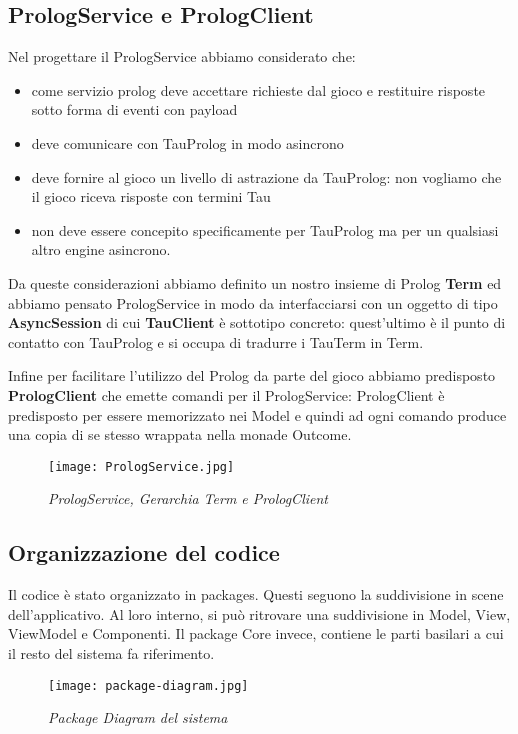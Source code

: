\subsection{PrologService e PrologClient}
Nel progettare il PrologService abbiamo considerato che:
\begin{itemize}
    \item come servizio prolog deve accettare richieste dal gioco e restituire risposte sotto forma di eventi con payload
    \item deve comunicare con TauProlog in modo asincrono
    \item deve fornire al gioco un livello di astrazione da TauProlog: non vogliamo che il gioco riceva risposte con termini Tau
    \item non deve essere concepito specificamente per TauProlog ma per un qualsiasi altro engine asincrono.
\end{itemize}   

Da queste considerazioni abbiamo definito un nostro insieme di Prolog \textbf{Term} ed abbiamo pensato PrologService in modo da interfacciarsi con un oggetto di tipo \textbf{AsyncSession} di cui \textbf{TauClient} è sottotipo concreto: quest'ultimo è il punto di contatto con TauProlog e si occupa di tradurre i TauTerm in Term.

Infine per facilitare l'utilizzo del Prolog da parte del gioco abbiamo predisposto \textbf{PrologClient} che emette comandi per il PrologService: PrologClient è predisposto per essere memorizzato nei Model e quindi ad ogni comando produce una copia di se stesso wrappata nella monade Outcome.

\begin{figure}[!hbt]
    \centering
    \texttt{[image: PrologService.jpg]}
    \caption{\textit{PrologService, Gerarchia Term e PrologClient}} 
\end{figure}

\subsection{Organizzazione del codice}
Il codice è stato organizzato in packages. Questi seguono la suddivisione in scene dell'applicativo. Al loro interno, si può ritrovare una suddivisione in Model, View, ViewModel e Componenti.
Il package Core invece, contiene le parti basilari a cui il resto del sistema fa riferimento.

\begin{figure}[!hbt]
    \centering
    \texttt{[image: package-diagram.jpg]}
    \caption{\textit{Package Diagram del sistema}} 
\end{figure}